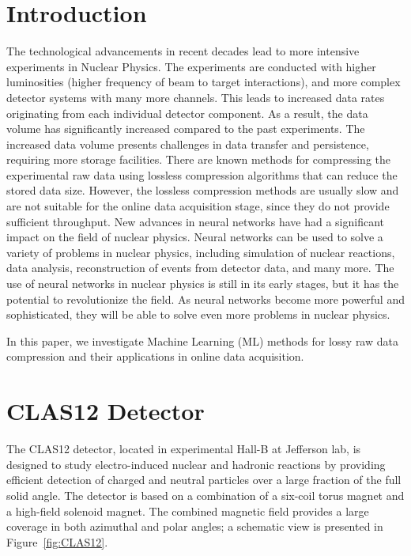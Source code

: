 \section{Introduction}

The technological advancements in recent decades lead to more intensive experiments in Nuclear Physics. The experiments are conducted with higher luminosities (higher frequency of beam to target interactions), and more complex detector systems with many more channels. This leads to increased data rates originating from each individual detector component. As a result, the data volume has significantly increased compared to the past experiments. The increased data volume presents challenges in data transfer and persistence, requiring more storage facilities. There are known methods for compressing the experimental raw data using lossless compression algorithms that can reduce the stored data size. However, the lossless compression methods are usually slow and are not suitable for the online data acquisition stage, since they do not provide sufficient throughput. 
New advances in neural networks have had a significant impact on the field of nuclear physics. Neural networks can be used to solve a variety of problems in nuclear physics, including simulation of nuclear reactions, data analysis, reconstruction of events from detector data, and many more. The use of neural networks in nuclear physics is still in its early stages, but it has the potential to revolutionize the field. As neural networks become more powerful and sophisticated, they will be able to solve even more problems in nuclear physics.

In this paper, we investigate Machine Learning (ML) methods for lossy raw data compression and their applications in online data acquisition.

\section{CLAS12 Detector}

The CLAS12 detector, located in experimental Hall-B at Jefferson lab, is designed 
to study electro-induced nuclear and hadronic reactions by providing efficient 
detection of charged and neutral particles over a large fraction of the full solid angle. 
The detector is based on a combination of a six-coil torus magnet and
a high-field solenoid magnet. The combined magnetic field provides a large 
coverage in both azimuthal and polar angles; a schematic view is presented in Figure~\ref{fig:CLAS12}. 

